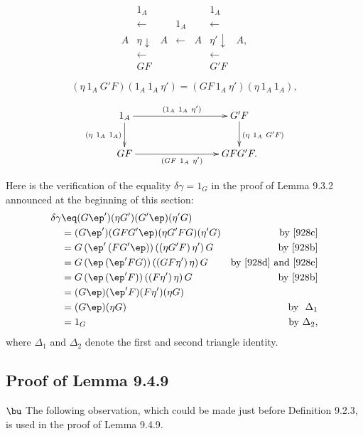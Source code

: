 \documentclass[12pt]{article}
\begin{document}
\newpage

$$
\begin{array}{ccccccc}
&1_A&&&&1_A\\
&\leftarrow&&1_A&&\leftarrow\\
A&\eta\downarrow&A&\leftarrow&A&\eta'\downarrow&A,\\
&\leftarrow&&&&\leftarrow\\
&GF&&&&G'F
\end{array}
$$

\begin{equation}\label{928e}
(\eta\ 1_A\ G'F)(1_A\ 1_A\ \eta')=(GF\ 1_A\ \eta')(\eta\ 1_A\ 1_A),
\end{equation}

$$
\xymatrix{
1_A\ar[rrr]^{(1_A\ 1_A\ \eta')}\ar[d]_{(\eta\ 1_A\ 1_A)}&&&G'F\ar[d]^{(\eta\ 1_A\ G'F)}\\ 
GF\ar[rrr]_{(GF\ 1_A\ \eta')}&&&GFG'F.}
$$ 



Here is the verification of the equality $\delta\gamma=1_G$ in the proof of Lemma 9.3.2 announced at the beginning of this section: 
\begin{align*}
\delta\gamma &\eq(G\ep')(\eta G')(G'\ep)(\eta'G)\\
&=(G\ep')(G F G'\ep)(\eta G' F G)(\eta'G)&\text{by \eqref{928c}}\\
&=G\,(\ep'\,(FG'\ep))\,((\eta G'F)\,\eta')\,G&\text{by \eqref{928b}}\\
&=G\,(\ep\,(\ep'FG))\,((GF\eta')\,\eta)\,G&\text{by \eqref{928d} and \eqref{928e}}\\
&=G\,(\ep\,(\ep'F))\,((F\eta')\,\eta)\,G&\text{by \eqref{928b}}\\
&=(G\ep)(\ep' F)(F\eta')(\eta G)\\
&=(G\ep)(\eta G)&\text{by $\ \Delta_1$}\\
&=1_G&\text{by $\Delta_2$,}
\end{align*} 
where $\Delta_1$ and $\Delta_2$ denote the first and second triangle identity.


\subsection{Proof of Lemma 9.4.9}

$\bu$ The following observation, which could be made just before Definition 9.2.3, is used in the proof of Lemma 9.4.9.
\end{document}
